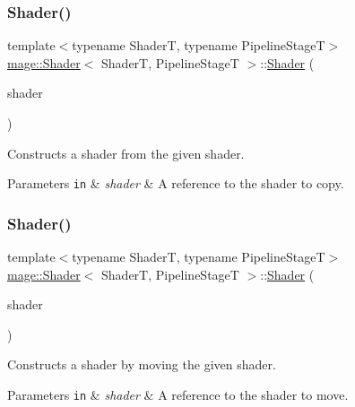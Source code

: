 \subsubsection{\texorpdfstring{Shader()}{Shader()}\hspace{0.1cm}{\footnotesize\ttfamily [3/4]}}
{\footnotesize\ttfamily template$<$typename ShaderT, typename Pipeline\+StageT$>$ \\
\hyperlink{classmage_1_1_shader}{mage\+::\+Shader}$<$ ShaderT, Pipeline\+StageT $>$\+::\hyperlink{classmage_1_1_shader}{Shader} (\begin{DoxyParamCaption}\item[{const \hyperlink{classmage_1_1_shader}{Shader}$<$ ShaderT, Pipeline\+StageT $>$ \&}]{shader }\end{DoxyParamCaption})\hspace{0.3cm}{\ttfamily [delete]}}

Constructs a shader from the given shader.


\begin{DoxyParams}[1]{Parameters}
\mbox{\tt in}  & {\em shader} & A reference to the shader to copy. \\
\hline
\end{DoxyParams}
\hypertarget{classmage_1_1_shader_a9d87b88ded8e6874d061cb8c54d6a5e9}{}\label{classmage_1_1_shader_a9d87b88ded8e6874d061cb8c54d6a5e9} 
\subsubsection{\texorpdfstring{Shader()}{Shader()}\hspace{0.1cm}{\footnotesize\ttfamily [4/4]}}
{\footnotesize\ttfamily template$<$typename ShaderT, typename Pipeline\+StageT$>$ \\
\hyperlink{classmage_1_1_shader}{mage\+::\+Shader}$<$ ShaderT, Pipeline\+StageT $>$\+::\hyperlink{classmage_1_1_shader}{Shader} (\begin{DoxyParamCaption}\item[{\hyperlink{classmage_1_1_shader}{Shader}$<$ ShaderT, Pipeline\+StageT $>$ \&\&}]{shader }\end{DoxyParamCaption})}

Constructs a shader by moving the given shader.


\begin{DoxyParams}[1]{Parameters}
\mbox{\tt in}  & {\em shader} & A reference to the shader to move. \\
\hline
\end{DoxyParams}
\hypertarget{classmage_1_1_shader_a10a954f75331d93c9549b2db5a2c838e}{}\label{classmage_1_1_shader_a10a954f75331d93c9549b2db5a2c838e} 

